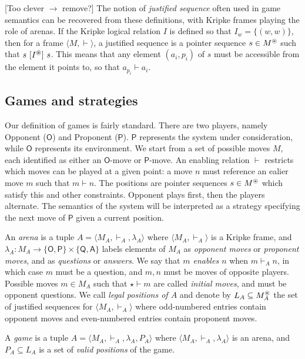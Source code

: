 \documentclass[acmsmall,anonymous]{acmart}
\newcommand{\kw}[1]{\ensuremath{ \textsf{#1} }}
\newcommand{\ifr}[1]{\ [{#1}]\ }
\begin{document}
[Too clever $\rightarrow$ remove?]
The notion of \emph{justified sequence}
often used in game semantics
can be recovered from these definitions,
with Kripke frames playing the role of arenas.
If the Kripke logical relation $I$
is defined so that $I_w = \{(w, w)\}$, then
for a frame $\langle M, \vdash \rangle$,
a justified sequence is a pointer sequence $s \in M^\oast$
such that $s \ifr{I^\oast} s$.
This means that any element $(a_i, p_i)$ of $s$
must be accessible from the element it points to,
so that $a_{p_i} \vdash a_i$.


\subsection{Games and strategies} %

Our definition of games is fairly standard.
There are two players,
namely Opponent (\kw{O}) and Proponent (\kw{P}).
\kw{P} represents the system under consideration,
while \kw{O} represents its environment.
We start from a set of possible moves $M$,
each identified as either an \kw{O}-move or \kw{P}-move.
An enabling relation $\vdash$ restricts which moves
can be played at a given point:
a move $n$ must reference an ealier move $m$
such that $m \vdash n$.
The positions are pointer sequences $s \in M^\oast$
which satisfy this and other constraints.
Opponent plays first, then the players alternate.
The semantics of the system will be interpreted as a strategy
specifying the next move of \kw{P}
given a current position.

\begin{definition}[Game]
An \emph{arena} is a tuple $A = \langle M_A, \vdash_A, \lambda_A \rangle$
where $\langle M_A, \vdash_A \rangle$ is a Kripke frame, and
$\lambda_A : M_A \rightarrow \{\kw{O},\kw{P}\} \times \{\kw{Q},\kw{A}\}$
labels elements of $M_A$ as \emph{opponent moves} or \emph{proponent moves},
and as \emph{questions} or \emph{answers}.
We say that \emph{$m$ enables $n$} when $m \vdash_A n$,
in which case $m$ must be a question,
and $m, n$ must be moves of opposite players.
Possible moves $m \in M_A$ such that $\star \vdash m$
are called \emph{initial moves},
and must be opponent questions.
We call \emph{legal positions of $A$}
and denote by $L_A \subseteq M_A^\oast$ the set of
justified sequences for $\langle M_A, \vdash_A \rangle$
where odd-numbered entries contain opponent moves and
even-numbered entries contain proponent moves.

A \emph{game} is a tuple $A = \langle M_A, \vdash_A, \lambda_A, P_A \rangle$
where $\langle M_A, \vdash_A, \lambda_A \rangle$ is an arena,
and $P_A \subseteq L_A$ is a set of \emph{valid positions} of the game.
\end{definition}
\end{document}
